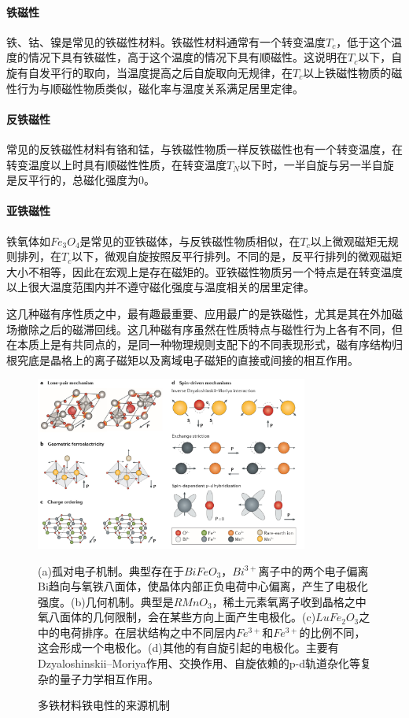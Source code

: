 \paragraph{铁磁性}
铁、钴、镍是常见的铁磁性材料。铁磁性材料通常有一个转变温度$T_{c}$，低于这个温度的情况下具有铁磁性，高于这个温度的情况下具有顺磁性。这说明在$T_{c}$以下，自旋有自发平行的取向，当温度提高之后自旋取向无规律，在$T_{c}$以上铁磁性物质的磁性行为与顺磁性物质类似，磁化率与温度关系满足居里定律。

\paragraph{反铁磁性}
常见的反铁磁性材料有铬和锰，与铁磁性物质一样反铁磁性也有一个转变温度，在转变温度以上时具有顺磁性性质，在转变温度$T_{N}$以下时，一半自旋与另一半自旋是反平行的，总磁化强度为0。

\paragraph{亚铁磁性}
铁氧体如$Fe_{3}O_{4}$是常见的亚铁磁体，与反铁磁性物质相似，在$T_{c}$以上微观磁矩无规则排列，在$T_{c}$以下，微观自旋按照反平行排列。不同的是，反平行排列的微观磁矩大小不相等，因此在宏观上是存在磁矩的。亚铁磁性物质另一个特点是在转变温度以上很大温度范围内并不遵守磁化强度与温度相关的居里定律。

这几种磁有序性质之中，最有趣最重要、应用最广的是铁磁性，尤其是其在外加磁场撤除之后的磁滞回线。这几种磁有序虽然在性质特点与磁性行为上各有不同，但在本质上是有共同点的，是同一种物理规则支配下的不同表现形式，磁有序结构归根究底是晶格上的离子磁矩以及离域电子磁矩的直接或间接的相互作用。

\begin{figure}[h]
    \centering
\includegraphics[width=0.8\textwidth]{./pic/006.png}
\caption{多铁材料铁电性的来源机制}
\small
(a)孤对电子机制。典型存在于$BiFeO_{3}$，$Bi^{3+}$离子中的两个电子偏离Bi趋向与氧铁八面体，使晶体内部正负电荷中心偏离，产生了电极化强度。(b)几何机制。典型是$RMnO_{3}$，稀土元素氧离子收到晶格之中氧八面体的几何限制，会在某些方向上面产生电极化。(c)$LuFe_{2}O_{3}$之中的电荷排序。在层状结构之中不同层内$Fe^{3+}$和$Fe^{3+}$的比例不同，这会形成一个电极化。(d)其他的有自旋引起的电极化。主要有Dzyaloshinskii–Moriya作用、交换作用、自旋依赖的p-d轨道杂化等复杂的量子力学相互作用。

\label{dog006}
\end{figure}

